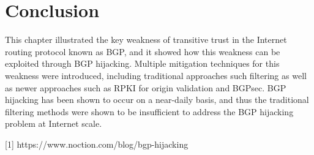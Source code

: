 \documentclass[conference]{IEEEtran}
\begin{document}
\section{Conclusion}
This chapter illustrated the key weakness of transitive trust in the Internet routing protocol known as BGP, and it showed how this weakness can be exploited through BGP hijacking.  Multiple mitigation techniques for this weakness were introduced, including traditional approaches such filtering as well as newer approaches such as RPKI for origin validation and BGPsec.  BGP hijacking has been shown to occur on a near-daily basis, and thus the traditional filtering methods were shown to be insufficient to address the BGP hijacking problem at Internet scale.


[1] https://www.noction.com/blog/bgp-hijacking
\end{document}
